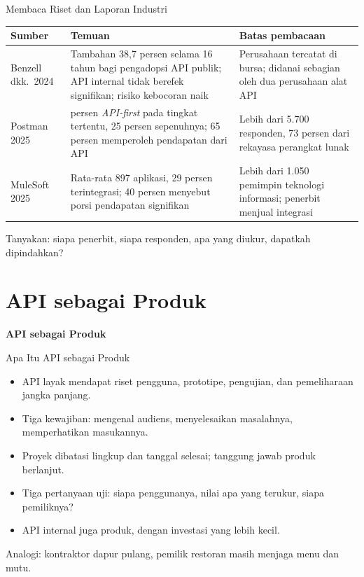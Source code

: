 \documentclass[aspectratio=169, table, 12pt]{beamer}
\begin{document}
\begin{frame}{{\Large Membaca Riset dan Laporan Industri}}
  \footnotesize
  \begin{tabularx}{\textwidth}{>{\raggedright\arraybackslash}p{2.2cm}
      >{\raggedright\arraybackslash}X >{\raggedright\arraybackslash}X}
    \hline
    \textbf{Sumber} & \textbf{Temuan} & \textbf{Batas pembacaan} \\ \hline
    Benzell dkk.\ 2024 & Tambahan 38,7 persen selama 16 tahun bagi pengadopsi API publik; API internal tidak berefek signifikan; risiko kebocoran naik & Perusahaan tercatat di bursa; didanai sebagian oleh dua perusahaan alat API \\ \hline
    Postman 2025 & 82 persen \textit{API-first} pada tingkat tertentu, 25 persen sepenuhnya; 65 persen memperoleh pendapatan dari API & Lebih dari 5.700 responden, 73 persen dari rekayasa perangkat lunak \\ \hline
    MuleSoft 2025 & Rata-rata 897 aplikasi, 29 persen terintegrasi; 40 persen menyebut porsi pendapatan signifikan & Lebih dari 1.050 pemimpin teknologi informasi; penerbit menjual integrasi \\ \hline
  \end{tabularx}

  \vspace{6pt}
  \small Tanyakan: siapa penerbit, siapa responden, apa yang diukur, dapatkah dipindahkan?
\end{frame}

\section{API sebagai Produk}

\begin{frame}{\hfill}
  \centering
  \Huge{\textbf{API sebagai Produk}}
\end{frame}

\begin{frame}{{\Large Apa Itu API sebagai Produk}}
  \vspace{10pt}
  \begin{itemize}
    \item API layak mendapat riset pengguna, prototipe, pengujian, dan pemeliharaan jangka panjang.
    \item Tiga kewajiban: mengenal audiens, menyelesaikan masalahnya, memperhatikan masukannya.
    \item Proyek dibatasi lingkup dan tanggal selesai; tanggung jawab produk berlanjut.
    \item Tiga pertanyaan uji: siapa penggunanya, nilai apa yang terukur, siapa pemiliknya?
    \item API internal juga produk, dengan investasi yang lebih kecil.
  \end{itemize}
  \vspace{6pt}
  {\small Analogi: kontraktor dapur pulang, pemilik restoran masih menjaga menu dan mutu.}
\end{frame}
\end{document}
